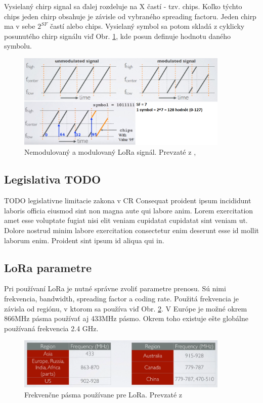\documentclass[slovak,master]{diploma}
\begin{document}
Vysielaný chirp signal sa ďalej rozdeluje na X častí - tzv. chips. Koľko týchto chips jeden chirp obsahuje je závisle od vybraného spreading factoru. 
Jeden chirp ma v sebe $2^{SF}$ častí alebo chips. Vysielaný symbol sa potom skladá z cyklicky posunutého chirp signálu viď 
Obr. \ref{fig:loraModulation}, kde posun definuje hodnotu daného symbolu.
\begin{figure}
	\centering
	\includegraphics[width=0.9\textwidth]{Figures/loraModulation.png}
	\caption{Nemodulovaný a modulovaný LoRa signál. Prevzaté z \cite{loraMod}, \cite{loraMod2}}
	\label{fig:loraModulation}
\end{figure}

\subsection{Legislativa TODO}
TODO legislativne limitacie zakona v CR
Consequat proident ipsum incididunt laboris officia eiusmod sint non magna aute qui labore anim. Lorem exercitation amet esse voluptate fugiat 
nisi elit veniam cupidatat cupidatat sint veniam ut. Dolore nostrud minim labore exercitation consectetur enim deserunt esse id mollit laborum enim. 
Proident sint ipsum id aliqua qui in.
\newpage

\subsection{LoRa parametre}
Pri používaní LoRa je nutné správne zvoliť parametre prenosu. Sú nimi frekvencia, bandwidth, spreading factor a coding rate.
Použitá frekvencia je závisla od regiónu, v ktorom sa používa viď Obr. \ref{fig:ismBands}. 
V Európe je možné okrem 866MHz pásma používať aj 433MHz pásmo. Okrem toho existuje ešte globálne používaná frekvencia 2.4 GHz.
\begin{figure}[h!]
	\centering
	\includegraphics[width=0.9\textwidth]{Figures/ism_bands.png}
	\caption{Frekvenčne pásma používane pre LoRa. Prevzaté z \cite{loraMod}}
	\label{fig:ismBands}
\end{figure}
\end{document}
